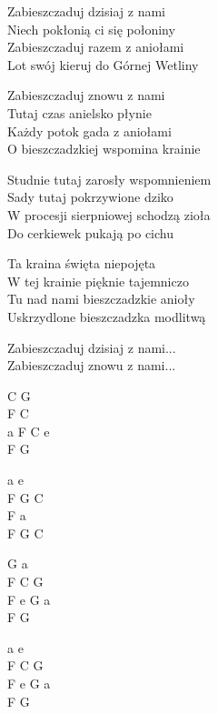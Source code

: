 \begin{text}
    Zabieszczaduj dzisiaj z nami\\
    Niech pokłonią ci się połoniny\\
    Zabieszczaduj razem z aniołami\\
    Lot swój kieruj do Górnej Wetliny

    Zabieszczaduj znowu z nami\\
    Tutaj czas anielsko płynie\\
    Każdy potok gada z aniołami\\
    O bieszczadzkiej wspomina krainie

    \vin Studnie tutaj zarosły wspomnieniem\\
    \vin Sady tutaj pokrzywione dziko\\
    \vin W procesji sierpniowej schodzą zioła\\
    \vin Do cerkiewek pukają po cichu

    \vin Ta kraina święta niepojęta\\
    \vin W tej krainie pięknie tajemniczo\\
    \vin Tu nad nami bieszczadzkie anioły\\
    \vin Uskrzydlone bieszczadzka modlitwą

    Zabieszczaduj dzisiaj z nami...\\
    Zabieszczaduj znowu z nami...
\end{text}
\begin{chord}
    C G\\
    F C\\
    a F C e\\
    F G

    a e\\
    F G C\\
    F a\\
    F G C

    G a\\
    F C G\\
    F e G a\\
    F G

    a e\\
    F C G\\
    F e G a\\
    F G

\end{chord}